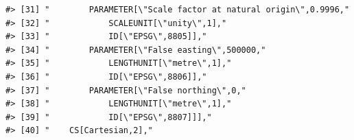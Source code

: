 \documentclass[
]{book}
\begin{document}
\begin{verbatim}
#> [31] "        PARAMETER[\"Scale factor at natural origin\",0.9996,"                                                                                                                                                                                                                   
#> [32] "            SCALEUNIT[\"unity\",1],"                                                                                                                                                                                                                                            
#> [33] "            ID[\"EPSG\",8805]],"                                                                                                                                                                                                                                                
#> [34] "        PARAMETER[\"False easting\",500000,"                                                                                                                                                                                                                                    
#> [35] "            LENGTHUNIT[\"metre\",1],"                                                                                                                                                                                                                                           
#> [36] "            ID[\"EPSG\",8806]],"                                                                                                                                                                                                                                                
#> [37] "        PARAMETER[\"False northing\",0,"                                                                                                                                                                                                                                        
#> [38] "            LENGTHUNIT[\"metre\",1],"                                                                                                                                                                                                                                           
#> [39] "            ID[\"EPSG\",8807]]],"                                                                                                                                                                                                                                               
#> [40] "    CS[Cartesian,2],"                                                                                                                                                                                                                                                           

\end{verbatim}
\end{document}
